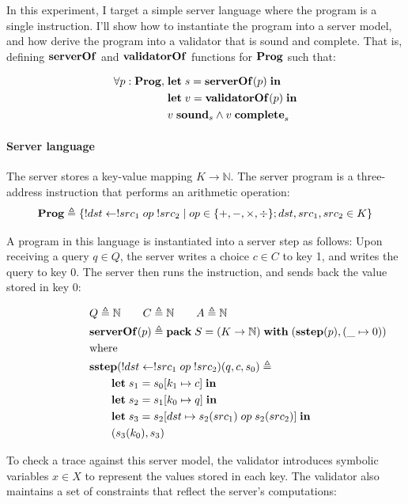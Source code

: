 \documentclass{article}
\theoremstyle{definition}
\newcommand{\Nat}{\mathbb N}
\newcommand{\Let}{\ottkw{let}\;}
\newcommand{\In}{\;\ottkw{in}}
\newcommand{\letin}[2]{\Let#1=#2\In}
\newcommand{\existT}[3]{\ottkw{pack}\;#1=#2\;\ottkw{with}\;#3}
\newcommand{\sstep}{\ottkw{sstep}}
\newcommand{\sound}{\ottkw{sound}}
\newcommand{\issound}[2]{#1\;\sound_{#2}}
\newcommand{\complete}{\ottkw{complete}}
\newcommand{\iscomplete}[2]{#1\;\complete_{#2}}
\newcommand{\Prog}{\ottkw{Prog}}
\newcommand{\serverOf}{\ottkw{serverOf}}
\newcommand{\validatorOf}{\ottkw{validatorOf}}
\begin{document}
In this experiment, I target a simple server language where the program is a
single instruction.  I'll show how to instantiate the program into a server
model, and how derive the program into a validator that is sound and complete.
That is, defining $\serverOf$ and $\validatorOf$ functions for $\Prog$ such
that:

\begin{align*}
  \forall p:\Prog,\;&\letin{s}{\serverOf(p)}\\
  &\letin{v}{\validatorOf(p)}\\
  &\issound{v}{s}\wedge\iscomplete{v}{s}
\end{align*}

\paragraph{Server language}
The server stores a key-value mapping $K\to\Nat$.  The server program is a
three-address instruction that performs an arithmetic operation:
\[\Prog \triangleq \{!dst\gets !src_1\;op\;!src_2\mid op\in\{+,-,\times,\div\};
dst,src_1,src_2\in K\}\]

A program in this language is instantiated into a server step as follows: Upon
receiving a query $q\in Q$, the server writes a choice $c\in C$ to key 1, and
writes the query to key 0.  The server then runs the instruction, and sends back
the value stored in key 0:

\begin{align*}
  \rlap{$Q\triangleq\Nat\qquad C\triangleq\Nat\qquad A\triangleq\Nat$}\\
  \rlap{$\serverOf(p)\triangleq\existT{S}{(K\to\Nat)}{(\sstep(p), (\_\mapsto0))}$}\\
  \rlap{where}\\
  \rlap{$\sstep(!dst\gets !src_1\;op\;!src_2)(q,c,s_0)\triangleq$}\\
  &\qquad\letin{s_1}{s_0 [k_1\mapsto c]}\\
  &\qquad\letin{s_2}{s_1 [k_0\mapsto q]}\\
  &\qquad\letin{s_3}{s_2 [dst\mapsto s_2(src_1)\;op\;s_2(src_2)]}\\
  &\qquad(s_3(k_0), s_3)
\end{align*}

To check a trace against this server model, the validator introduces symbolic
variables $x\in X$ to represent the values stored in each key.  The validator
also maintains a set of constraints that reflect the server's computations:
\end{document}
